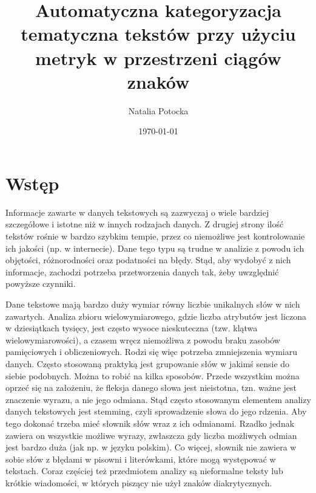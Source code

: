 \documentclass{praca1}
\author{Natalia Potocka}
\title{Automatyczna kategoryzacja tematyczna tekstów przy użyciu metryk w przestrzeni ciągów znaków}
\date{\today}
\begin{document}
%
%
%
%


  \tableofcontents

\chapter{Wstęp}

Informacje zawarte w danych tekstowych są zazwyczaj o wiele bardziej szczegółowe i istotne niż w innych rodzajach danych. Z drugiej strony ilość tekstów rośnie w bardzo szybkim tempie, przez co niemożliwe jest kontrolowanie ich jakości (np. w internecie). Dane tego typu są trudne w analizie z powodu ich objętości, różnorodności oraz podatności na błędy. Stąd, aby wydobyć z nich informacje, zachodzi potrzeba przetworzenia danych tak, żeby uwzględnić powyższe czynniki.

Dane tekstowe mają bardzo duży wymiar równy liczbie unikalnych słów w nich zawartych. Analiza zbioru wielowymiarowego, gdzie liczba atrybutów jest liczona w dziesiątkach tysięcy, jest często wysoce nieskuteczna (tzw. klątwa wielowymiarowości), a czasem wręcz niemożliwa z powodu braku zasobów pamięciowych i obliczeniowych. Rodzi się więc potrzeba zmniejszenia wymiaru danych. Często stosowaną praktyką jest grupowanie słów w jakimś sensie do siebie podobnych. Można to robić na kilka sposobów. Przede wszystkim można oprzeć się na założeniu, że fleksja danego słowa jest nieistotna, tzn. ważne jest znaczenie wyrazu, a nie jego odmiana. Stąd często stosowanym elementem analizy danych tekstowych jest stemming, czyli sprowadzenie słowa do jego rdzenia. Aby tego dokonać trzeba mieć słownik słów wraz z ich odmianami. Rzadko jednak zawiera on wszystkie możliwe wyrazy, zwłaszcza gdy liczba możliwych odmian jest bardzo duża (jak np. w języku polskim). Co więcej, słownik nie zawiera w sobie słów z błędami w pisowni i literówkami, które mogą występować w tekstach. Coraz częściej też przedmiotem analizy są nieformalne teksty lub krótkie wiadomości, w których piszący nie użył znaków diakrytycznych.
\end{document}
